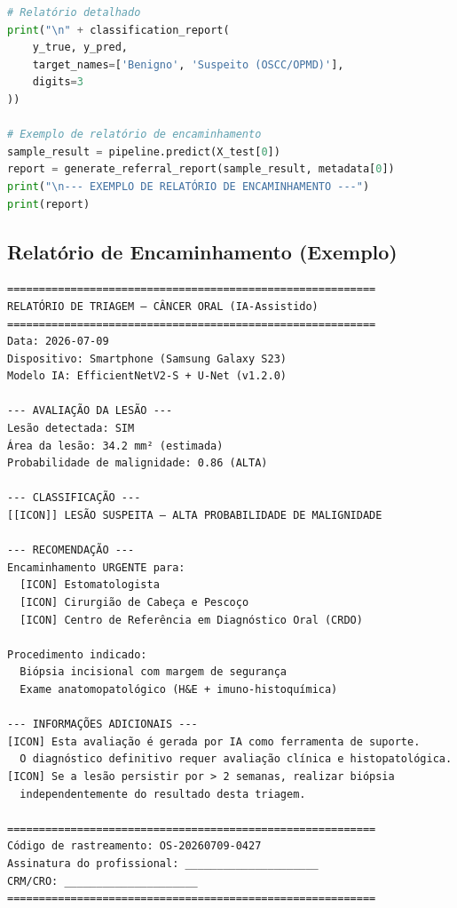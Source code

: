 \begin{lstlisting}[language=Python, caption={Pipeline de detecção de câncer oral},
label={lst:cancer-pipeline}]
# Relatório detalhado
print("\n" + classification_report(
    y_true, y_pred,
    target_names=['Benigno', 'Suspeito (OSCC/OPMD)'],
    digits=3
))

# Exemplo de relatório de encaminhamento
sample_result = pipeline.predict(X_test[0])
report = generate_referral_report(sample_result, metadata[0])
print("\n--- EXEMPLO DE RELATÓRIO DE ENCAMINHAMENTO ---")
print(report)
\end{lstlisting}

\subsection{Relatório de Encaminhamento (Exemplo)}

\begin{lstlisting}[language={}, caption={Relatório de encaminhamento gerado},
label={lst:referral-report}]
==========================================================
RELATÓRIO DE TRIAGEM — CÂNCER ORAL (IA-Assistido)
==========================================================
Data: 2026-07-09
Dispositivo: Smartphone (Samsung Galaxy S23)
Modelo IA: EfficientNetV2-S + U-Net (v1.2.0)

--- AVALIAÇÃO DA LESÃO ---
Lesão detectada: SIM
Área da lesão: 34.2 mm² (estimada)
Probabilidade de malignidade: 0.86 (ALTA)

--- CLASSIFICAÇÃO ---
[[ICON]] LESÃO SUSPEITA — ALTA PROBABILIDADE DE MALIGNIDADE

--- RECOMENDAÇÃO ---
Encaminhamento URGENTE para:
  [ICON] Estomatologista
  [ICON] Cirurgião de Cabeça e Pescoço
  [ICON] Centro de Referência em Diagnóstico Oral (CRDO)

Procedimento indicado:
  Biópsia incisional com margem de segurança
  Exame anatomopatológico (H&E + imuno-histoquímica)

--- INFORMAÇÕES ADICIONAIS ---
[ICON] Esta avaliação é gerada por IA como ferramenta de suporte.
  O diagnóstico definitivo requer avaliação clínica e histopatológica.
[ICON] Se a lesão persistir por > 2 semanas, realizar biópsia
  independentemente do resultado desta triagem.

==========================================================
Código de rastreamento: OS-20260709-0427
Assinatura do profissional: _____________________
CRM/CRO: _____________________
==========================================================
\end{lstlisting}


